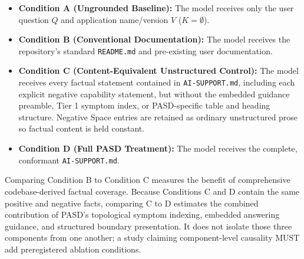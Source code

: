 \documentclass[12pt, a4paper]{article}
\begin{document}
\begin{itemize}
    \item \textbf{Condition A (Ungrounded Baseline):} The model receives only the user question $Q$ and application name/version $V$ ($K = \emptyset$).
    \item \textbf{Condition B (Conventional Documentation):} The model receives the repository's standard \texttt{README.md} and pre-existing user documentation.
    \item \textbf{Condition C (Content-Equivalent Unstructured Control):} The model receives every factual statement contained in \texttt{AI-SUPPORT.md}, including each explicit negative capability statement, but without the embedded guidance preamble, Tier 1 symptom index, or PASD-specific table and heading structure. Negative Space entries are retained as ordinary unstructured prose so factual content is held constant.
    \item \textbf{Condition D (Full PASD Treatment):} The model receives the complete, conformant \texttt{AI-SUPPORT.md}.
\end{itemize}

Comparing Condition B to Condition C measures the benefit of comprehensive codebase-derived factual coverage. Because Conditions C and D contain the same positive and negative facts, comparing C to D estimates the combined contribution of PASD's topological symptom indexing, embedded answering guidance, and structured boundary presentation. It does not isolate those three components from one another; a study claiming component-level causality MUST add preregistered ablation conditions.
\end{document}
